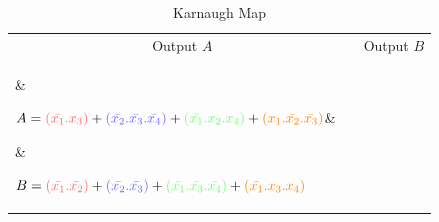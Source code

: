 \documentclass[11pt,a4paper,normalphoto,withhyper]{altareport}
\begin{document}
\begin{table}[htbp!]
	\begin{center}
    \caption{Karnaugh Map}
    \label{tab:example_Karnaugh_Map}
    \begin{tabular}{p{4cm} p{3.8cm} | p{4cm} p{3.8cm}}
    
      \multicolumn{2}{c}{Output $A$} & \multicolumn{2}{c}{{Output $B$}} \\
      \parbox[c]{5mm}{} &
      
      $ A = \textcolor{LightRed}{(\bar{x_1}.x_3)} 
      + \textcolor{LightBlue}{(\bar{x_2}.\bar{x_3}.\bar{x_4})} 
      + \textcolor{LightGreen}{(\bar{x_1}.x_2.x_4)} 
      + \textcolor{orange}{(x_1.\bar{x_2}.\bar{x_3})}$&
      
      
      \parbox[c]{5mm}{} &
      
      $ B = \textcolor{LightRed}{(\bar{x_1}.\bar{x_2})}
      + \textcolor{LightBlue}{(\bar{x_2}.\bar{x_3})} 
      + \textcolor{LightGreen}{(\bar{x_1}.\bar{x_3}.\bar{x_4})} 
      + \textcolor{orange}{(\bar{x_1}.x_3.x_4)}$ \\
      
      
      
      
       & \\
      \parbox[c]{5mm}{} &
      
      $ C = \textcolor{LightRed}{(\bar{x_1}.x_2)} 
      + \textcolor{LightBlue}{(\bar{x_2}.\bar{x_3})} 
      + \textcolor{LightGreen}{(\bar{x_1}.x_4)} 
      + \textcolor{orange}{(\bar{x_1}.\bar{x_3})}$ &
      

\end{tabular}
\end{center}
\end{table}
\end{document}
